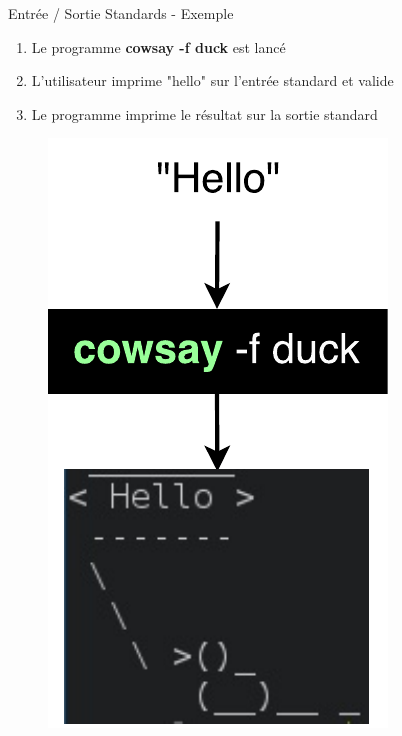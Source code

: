 \documentclass[xcolor=table]{beamer}
\begin{document}
\begin{frame}{Entrée / Sortie Standards - Exemple}
\begin{enumerate}
    \item Le programme \textbf{cowsay -f duck} est lancé
    \item L'utilisateur imprime "hello" sur l'entrée standard et valide
    \item Le programme imprime le résultat sur la sortie standard
\end{enumerate}
\begin{figure}
\includegraphics[scale=0.5]{fig/in-out-example.pdf}
\end{figure}
\end{frame}
\end{document}
